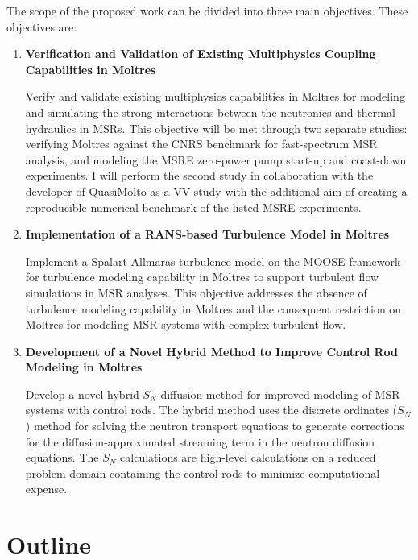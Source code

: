 The scope of the proposed work can be divided into three main objectives. These objectives are:
%
\begin{enumerate}[itemindent=20pt, listparindent=1.5em, label=\textbf{\arabic*}]
  \item \textbf{Verification and Validation of Existing Multiphysics Coupling Capabilities in
    Moltres}

    Verify and validate existing multiphysics capabilities in Moltres for modeling and simulating
    the strong interactions between the neutronics and thermal-hydraulics in \glspl{MSR}. This
    objective will be met through two separate studies: verifying Moltres against the CNRS
    benchmark \cite{tiberga_results_2020} for fast-spectrum \gls{MSR} analysis, and modeling the
    \gls{MSRE} zero-power pump start-up and coast-down experiments. I will perform the second study
    in collaboration with the developer of QuasiMolto \cite{reynolds_analysis_2023} as a \gls{VV}
    study with the additional aim of creating a reproducible numerical benchmark of the listed
    \gls{MSRE} experiments.

  \item \textbf{Implementation of a \gls{RANS}-based Turbulence Model in Moltres}

    Implement a Spalart-Allmaras turbulence model on the \gls{MOOSE} framework for
    turbulence modeling capability in Moltres to support turbulent flow simulations in \gls{MSR}
    analyses. This objective addresses the absence of turbulence modeling capability in
    Moltres and the consequent restriction on Moltres for modeling \gls{MSR} systems with complex
    turbulent flow.

  \item \textbf{Development of a Novel Hybrid Method to Improve Control Rod Modeling in Moltres}

    Develop a novel hybrid $S_N$-diffusion method for improved modeling of \gls{MSR} systems with
    control rods. The hybrid method uses the discrete ordinates ($S_N$) method for solving the
    neutron transport equations to generate corrections for the diffusion-approximated streaming
    term in the neutron diffusion equations. The $S_N$ calculations are high-level
    calculations on a reduced problem domain containing the control rods to minimize computational
    expense.
\end{enumerate}

\section{Outline}

